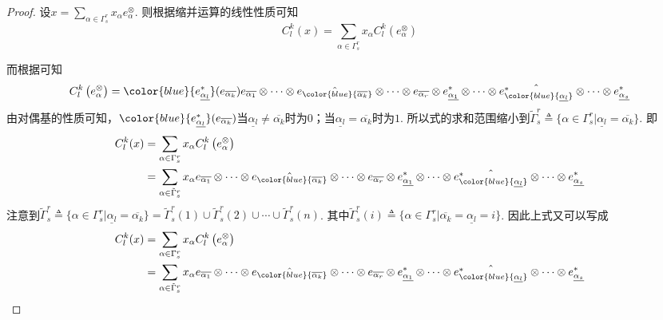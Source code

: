 \begin{proof}
	设$x=\sum_{ \alpha\in \Gamma^{r}_{s} }x_{\alpha}e^{\otimes}_{\alpha}$. 则根据缩并运算的线性性质可知
	\begin{equation}
		C^{k}_{l}(x)=\sum_{ \alpha\in \Gamma^{r}_{s} }x_{\alpha}C^{k}_{l}\left(e^{\otimes}_{\alpha}\right)
	\end{equation}
	
	而根据可知
	\[
	C^{k}_{l}\left(e^{\otimes}_{\alpha}\right)={\color{blue}{e^{\ast}_{\underline{\alpha_{ l }}}} (e_{\overline{\alpha_{ k }}})}e_{\overline{\alpha_{ 1 }}}\otimes \cdots\otimes \hat{e_{\color{blue}{\overline{\alpha_{ k }}}}}\otimes \cdots\otimes e_{\overline{\alpha_{ r }}}\otimes e^{\ast}_{\underline{\alpha_{ 1 }}}\otimes\cdots\otimes \hat{e^{\ast}_{\color{blue}{\underline{\alpha_{ l }}}}}\otimes\cdots\otimes  e^{\ast}_{\underline{\alpha_{ s }}}
	\]
	由对偶基的性质可知，${\color{blue}{e^{\ast}_{\underline{\alpha_{ l }}}} (e_{\overline{\alpha_{ k }}})}$当$\underline{\alpha_{ l }}\neq \overline{\alpha_{ k }}$时为$0$；当$\underline{\alpha_{ l }}= \overline{\alpha_{ k }}$时为$1$. 所以式的求和范围缩小到$\tilde{  \Gamma  }^{r}_{s}\triangleq \{\alpha\in \Gamma^{r}_{s} | \underline{\alpha_{ l }}= \overline{\alpha_{ k }} \}$. 即
	\[
	\begin{split}
	C^{k}_{l}(x)&=\sum_{ \alpha\in \Gamma^{r}_{s} }x_{\alpha}C^{k}_{l}\left(e^{\otimes}_{\alpha}\right)\\
	&=\sum_{ \alpha\in \tilde{  \Gamma  }^{r}_{s} }x_{\alpha}e_{\overline{\alpha_{ 1 }}}\otimes \cdots\otimes \hat{e_{\color{blue}{\overline{\alpha_{ k }}}}}\otimes \cdots\otimes e_{\overline{\alpha_{ r }}}\otimes e^{\ast}_{\underline{\alpha_{ 1 }}}\otimes\cdots\otimes \hat{e^{\ast}_{\color{blue}{\underline{\alpha_{ l }}}}}\otimes\cdots\otimes  e^{\ast}_{\underline{\alpha_{ s }}}\\
	\end{split}
	\]
	注意到$\tilde{  \Gamma  }^{r}_{s}\triangleq \{\alpha\in \Gamma^{r}_{s} | \underline{\alpha_{ l }}= \overline{\alpha_{ k }} \}=\tilde{  \Gamma  }^{r}_{s}(1)\cup\tilde{  \Gamma  }^{r}_{s}(2)\cup\cdots\cup \tilde{  \Gamma  }^{r}_{s}(n)$. 其中$\tilde{  \Gamma  }^{r}_{s}(i)\triangleq \{\alpha\in \Gamma^{r}_{s} | \overline{\alpha_{ k }}=\underline{\alpha_{ l }}=i\}$. 因此上式又可以写成
	\[
	\begin{split}
	C^{k}_{l}(x)&=\sum_{ \alpha\in \Gamma^{r}_{s} }x_{\alpha}C^{k}_{l}\left(e^{\otimes}_{\alpha}\right)\\
	&=\sum_{ \alpha\in \tilde{  \Gamma  }^{r}_{s} }x_{\alpha}e_{\overline{\alpha_{ 1 }}}\otimes \cdots\otimes \hat{e_{\color{blue}{\overline{\alpha_{ k }}}}}\otimes \cdots\otimes e_{\overline{\alpha_{ r }}}\otimes e^{\ast}_{\underline{\alpha_{ 1 }}}\otimes\cdots\otimes \hat{e^{\ast}_{\color{blue}{\underline{\alpha_{ l }}}}}\otimes\cdots\otimes  e^{\ast}_{\underline{\alpha_{ s }}}\\

\end{split}\]
\end{proof}
